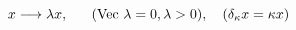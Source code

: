 \begin{equation}
x \longrightarrow \lambda x,~~~~~({\rm Vec}~\lambda=0, \lambda>0),~~~(\delta_{\kappa}x=\kappa
x)
\end{equation}

